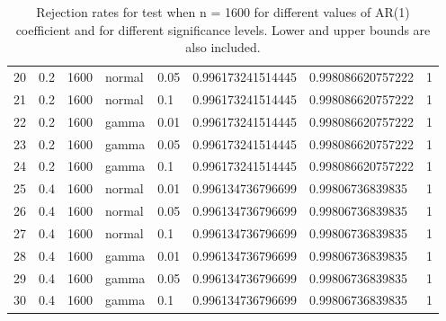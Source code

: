 \begin{table}[ht]
\begin{tabular}{rlllllll}
  20 & 0.2 & 1600 & normal & 0.05 & 0.996173241514445 & 0.998086620757222 & 1 \\ 
  21 & 0.2 & 1600 & normal & 0.1 & 0.996173241514445 & 0.998086620757222 & 1 \\ 
  22 & 0.2 & 1600 & gamma & 0.01 & 0.996173241514445 & 0.998086620757222 & 1 \\ 
  23 & 0.2 & 1600 & gamma & 0.05 & 0.996173241514445 & 0.998086620757222 & 1 \\ 
  24 & 0.2 & 1600 & gamma & 0.1 & 0.996173241514445 & 0.998086620757222 & 1 \\ 
  25 & 0.4 & 1600 & normal & 0.01 & 0.996134736796699 & 0.99806736839835 & 1 \\ 
  26 & 0.4 & 1600 & normal & 0.05 & 0.996134736796699 & 0.99806736839835 & 1 \\ 
  27 & 0.4 & 1600 & normal & 0.1 & 0.996134736796699 & 0.99806736839835 & 1 \\ 
  28 & 0.4 & 1600 & gamma & 0.01 & 0.996134736796699 & 0.99806736839835 & 1 \\ 
  29 & 0.4 & 1600 & gamma & 0.05 & 0.996134736796699 & 0.99806736839835 & 1 \\ 
  30 & 0.4 & 1600 & gamma & 0.1 & 0.996134736796699 & 0.99806736839835 & 1 \\ 
   \hline
\end{tabular}
\caption{Rejection rates for test when n = 1600 for 
                   different values of AR(1) coefficient and for different 
                   significance levels. Lower and upper bounds are also 
                   included.} 
\label{rr_1600}
\end{table}

